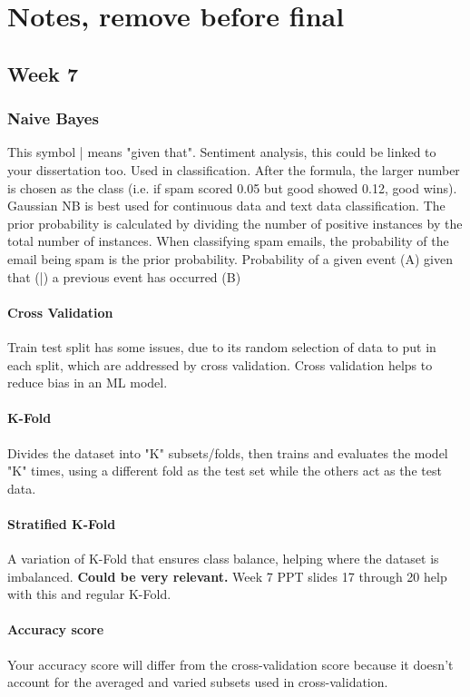\documentclass[12pt]{report}
\begin{document}
\chapter{Notes, remove before final}
\section{Week 7}
\subsection{Naive Bayes}
This symbol | means "given that".
Sentiment analysis, this could be linked to your dissertation too.
Used in classification. After the formula, the larger number is chosen as the class (i.e. if spam scored 0.05 but good showed 0.12, good wins).
Gaussian NB is best used for continuous data and text data classification.
The prior probability is calculated by dividing the number of positive instances by the total number of instances.
When classifying spam emails, the probability of the email being spam is the prior probability.
Probability of a given event (A) given that (|) a previous event has occurred (B)

\subsubsection{Cross Validation}
Train test split has some issues, due to its random selection of data to put in each split, which are addressed by cross validation.
Cross validation helps to reduce bias in an ML model.
\subsubsection{K-Fold}
Divides the dataset into "K" subsets/folds, then trains and evaluates the model "K" times, using a different fold as the test set while the others 
act as the test data.
\subsubsection{Stratified K-Fold}
A variation of K-Fold that ensures class balance, helping where the dataset is imbalanced. \textbf{Could be very relevant.}
Week 7 PPT slides 17 through 20 help with this and regular K-Fold.
\subsubsection{Accuracy score}
Your accuracy score will differ from the cross-validation score because it doesn't account for the averaged and varied subsets
used in cross-validation.
\end{document}
